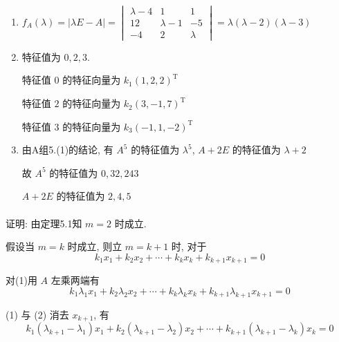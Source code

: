      \paragraph{} %
         \begin{enumerate}
             \item %
                   \( f_{A}(\lambda) = |\lambda E - A| = \begin{vmatrix}
                       \lambda - 4 & 1           & 1       \\
                       12          & \lambda - 1 & -5      \\
                       -4          & 2           & \lambda
                   \end{vmatrix} = \lambda(\lambda - 2)(\lambda - 3) \)
             \item %
                   特征值为 \( 0, 2, 3 \).

                   特征值 \( 0 \) 的特征向量为 \( k_{1}(1, 2, 2)^{\mathrm{T}} \)

                   特征值 \( 2 \) 的特征向量为 \( k_{2}(3, -1, 7)^{\mathrm{T}} \)

                   特征值 \( 3 \) 的特征向量为 \( k_{3}(-1, 1, -2)^{\mathrm{T}} \)
             \item %
                   由A组5.(1)的结论, 有 \( A^{5} \) 的特征值为 \( \lambda^{5} \), \( A+2E \) 的特征值为 \( \lambda+2 \)

                   故 \( A^{5} \) 的特征值为 \( 0, 32, 243 \)

                   \( A+2E \) 的特征值为 \( 2, 4, 5 \)
         \end{enumerate}


     \paragraph{} %
         证明: 由定理5.1知 \( m=2 \) 时成立.

         假设当 \( m=k \) 时成立, 则立 \( m=k+1 \) 时, 对于
         \[ k_{1}x_{1} + k_{2}x_{2} + \cdots + k_{k}x_{k} + k_{k+1}x_{k+1} = 0 \tag{1} \]

         对(1)用 \( A \) 左乘两端有
         \[ k_{1}\lambda_{1}x_{1} + k_{2}\lambda_{2}x_{2} + \cdots + k_{k}\lambda_{k}x_{k} + k_{k+1}\lambda_{k+1}x_{k+1} = 0 \tag{2} \]

         (1) 与 (2) 消去 \( x_{k+1} \), 有
         \[ k_{1}(\lambda_{k+1} - \lambda_{1})x_{1} + k_{2}(\lambda_{k+1} - \lambda_{2})x_{2} + \cdots + k_{k+1}(\lambda_{k+1} - \lambda_{k})x_{k} = 0 \]

